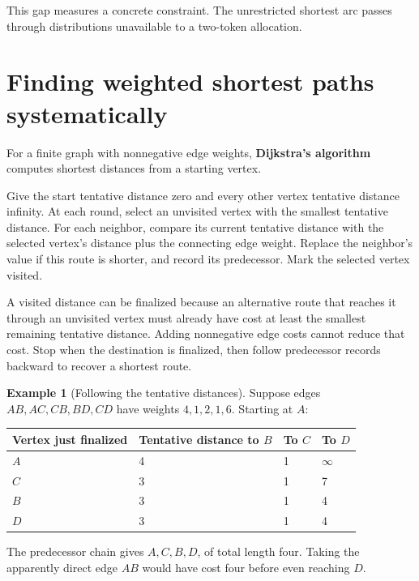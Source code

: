 \documentclass[11pt,oneside,openany]{book}
\theoremstyle{definition}
\newtheorem{example}{Example}[chapter]
\theoremstyle{remark}
\numberwithin{equation}{chapter}
\begin{document}
This gap measures a concrete constraint. The unrestricted shortest arc passes through distributions unavailable to a two-token allocation.

\section{Finding weighted shortest paths systematically}\label{ch08-finding-weighted-shortest-paths-systematically}

For a finite graph with nonnegative edge weights, \textbf{Dijkstra's algorithm} computes shortest distances from a starting vertex.

Give the start tentative distance zero and every other vertex tentative distance infinity. At each round, select an unvisited vertex with the smallest tentative distance. For each neighbor, compare its current tentative distance with the selected vertex's distance plus the connecting edge weight. Replace the neighbor's value if this route is shorter, and record its predecessor. Mark the selected vertex visited.

A visited distance can be finalized because an alternative route that reaches it through an unvisited vertex must already have cost at least the smallest remaining tentative distance. Adding nonnegative edge costs cannot reduce that cost. Stop when the destination is finalized, then follow predecessor records backward to recover a shortest route.

\begin{example}[Following the tentative distances]

Suppose edges \(AB,AC,CB,BD,CD\) have weights \(4,1,2,1,6\). Starting at \(A\):

\begin{longtable}[]{@{}llll@{}}
\toprule\noalign{}
Vertex just finalized & Tentative distance to \(B\) & To \(C\) & To \(D\) \\
\midrule\noalign{}
\endhead
\bottomrule\noalign{}
\endlastfoot
\(A\) & 4 & 1 & \(\infty\) \\
\(C\) & 3 & 1 & 7 \\
\(B\) & 3 & 1 & 4 \\
\(D\) & 3 & 1 & 4 \\
\end{longtable}

The predecessor chain gives \(A,C,B,D\), of total length four. Taking the apparently direct edge \(AB\) would have cost four before even reaching \(D\).

\end{example}
\end{document}
